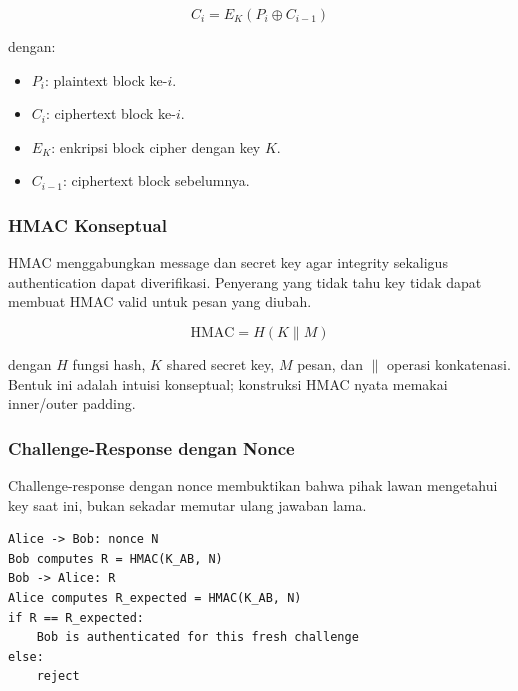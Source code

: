 \begin{equation}
    C_i = E_K(P_i \oplus C_{i-1})
    \label{eq:cbc-encrypt}
\end{equation}

dengan:
\begin{itemize}
    \item $P_i$: plaintext block ke-$i$.
    \item $C_i$: ciphertext block ke-$i$.
    \item $E_K$: enkripsi block cipher dengan key $K$.
    \item $C_{i-1}$: ciphertext block sebelumnya.
\end{itemize}

\subsubsection{HMAC Konseptual}
\begin{jawab}
HMAC menggabungkan message dan secret key agar integrity sekaligus authentication dapat diverifikasi. Penyerang yang tidak tahu key tidak dapat membuat HMAC valid untuk pesan yang diubah.
\end{jawab}

\begin{equation}
    \text{HMAC} = H(K \parallel M)
    \label{eq:hmac-concept}
\end{equation}

dengan $H$ fungsi hash, $K$ shared secret key, $M$ pesan, dan $\parallel$ operasi konkatenasi. Bentuk ini adalah intuisi konseptual; konstruksi HMAC nyata memakai inner/outer padding.

\subsubsection{Challenge-Response dengan Nonce}
\begin{jawab}
Challenge-response dengan nonce membuktikan bahwa pihak lawan mengetahui key saat ini, bukan sekadar memutar ulang jawaban lama.
\end{jawab}

\begin{lstlisting}[caption={Pseudocode challenge-response}, label={lst:challenge-response}]
Alice -> Bob: nonce N
Bob computes R = HMAC(K_AB, N)
Bob -> Alice: R
Alice computes R_expected = HMAC(K_AB, N)
if R == R_expected:
    Bob is authenticated for this fresh challenge
else:
    reject
\end{lstlisting}

